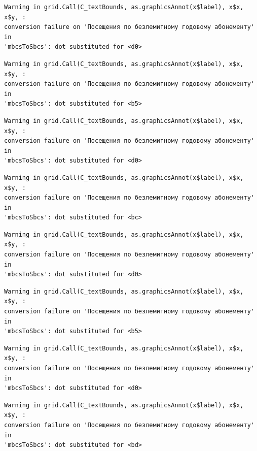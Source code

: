 \documentclass[
  letterpaper,
  DIV=11,
  numbers=noendperiod]{scrartcl}
\begin{document}
\begin{verbatim}
Warning in grid.Call(C_textBounds, as.graphicsAnnot(x$label), x$x, x$y, :
conversion failure on 'Посещения по безлемитному годовому абонементу' in
'mbcsToSbcs': dot substituted for <d0>
\end{verbatim}

\begin{verbatim}
Warning in grid.Call(C_textBounds, as.graphicsAnnot(x$label), x$x, x$y, :
conversion failure on 'Посещения по безлемитному годовому абонементу' in
'mbcsToSbcs': dot substituted for <b5>
\end{verbatim}

\begin{verbatim}
Warning in grid.Call(C_textBounds, as.graphicsAnnot(x$label), x$x, x$y, :
conversion failure on 'Посещения по безлемитному годовому абонементу' in
'mbcsToSbcs': dot substituted for <d0>
\end{verbatim}

\begin{verbatim}
Warning in grid.Call(C_textBounds, as.graphicsAnnot(x$label), x$x, x$y, :
conversion failure on 'Посещения по безлемитному годовому абонементу' in
'mbcsToSbcs': dot substituted for <bc>
\end{verbatim}

\begin{verbatim}
Warning in grid.Call(C_textBounds, as.graphicsAnnot(x$label), x$x, x$y, :
conversion failure on 'Посещения по безлемитному годовому абонементу' in
'mbcsToSbcs': dot substituted for <d0>
\end{verbatim}

\begin{verbatim}
Warning in grid.Call(C_textBounds, as.graphicsAnnot(x$label), x$x, x$y, :
conversion failure on 'Посещения по безлемитному годовому абонементу' in
'mbcsToSbcs': dot substituted for <b5>
\end{verbatim}

\begin{verbatim}
Warning in grid.Call(C_textBounds, as.graphicsAnnot(x$label), x$x, x$y, :
conversion failure on 'Посещения по безлемитному годовому абонементу' in
'mbcsToSbcs': dot substituted for <d0>
\end{verbatim}

\begin{verbatim}
Warning in grid.Call(C_textBounds, as.graphicsAnnot(x$label), x$x, x$y, :
conversion failure on 'Посещения по безлемитному годовому абонементу' in
'mbcsToSbcs': dot substituted for <bd>
\end{verbatim}
\end{document}
